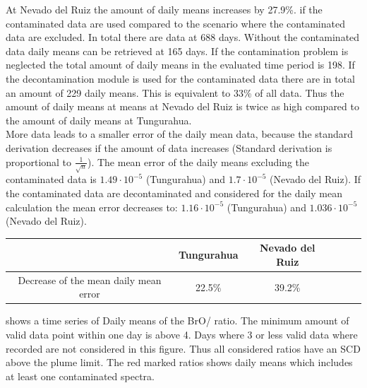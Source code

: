 \documentclass  [
  paper    = a4,
  BCOR     = 10mm,
  twoside,
  fontsize = 12pt,
  fleqn,
  toc      = bibnumbered,
  toc      = listofnumbered,
  numbers  = noendperiod,
  headings = normal,
  listof   = leveldown,
  version  = 3.03
]                                       {scrreprt}
\begin{document}
	At Nevado del Ruiz the amount of daily means increases by 27.9\%. if the contaminated data are used compared to the scenario where the contaminated data are excluded.
	In total there are data at 688 days. Without the contaminated data daily means can be retrieved at 165 days.
	If the contamination problem is neglected the total amount of daily means in the evaluated time period is 198. If the decontamination module is used for the contaminated data there are in total an amount of 229 daily means. This is  equivalent to 33\% of all data. Thus the amount of daily means at means at Nevado del Ruiz is twice as high compared to the amount of daily means at Tungurahua.\\
	More data leads to a smaller error of the daily mean data, because the standard derivation decreases if the amount of data increases (Standard derivation is proportional to $\frac{1}{\sqrt{n}}$). The mean error of the daily means excluding the contaminated data is $1.49\cdot 10^{-5}$ (Tungurahua) and $1.7\cdot 10^{-5}$ (Nevado del Ruiz). If the contaminated data are decontaminated and considered for the daily mean calculation the mean error decreases to: $1.16\cdot 10^{-5}$ (Tungurahua) and $1.036\cdot 10^{-5}$ (Nevado del Ruiz).
	\begin{table}
		\centering
		\begin{tabular}{ccc p{4cm}p{4cm}p{4cm}}
		&Tungurahua&Nevado del Ruiz\\
		\toprule
		Decrease of the mean daily mean error&22.5\%&39.2\%\\
		\bottomrule			
	\end{tabular}
	\end{table}		
	 shows a time series of Daily means of the BrO/ ratio. The minimum amount of valid data point within one day is above 4. Days where 3 or less valid data where recorded are not considered in this figure.  Thus all considered ratios have an  SCD above the plume limit. The red marked ratios shows daily means which includes at least one contaminated spectra.
%
%
\FloatBarrier
\end{document}
